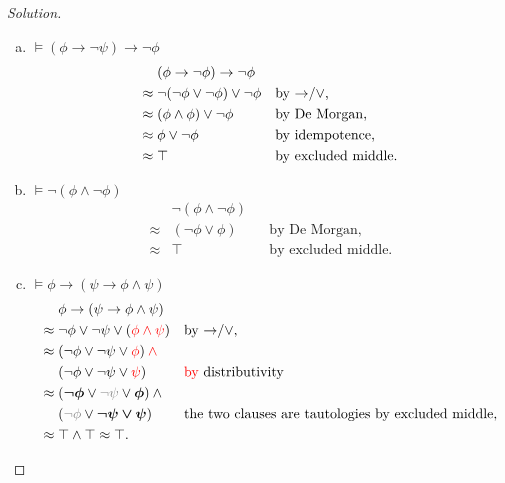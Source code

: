\documentclass[letter]{article}
\theoremstyle{definition}
\newenvironment{solution}
{\begin{proof}[Solution]}
	{\end{proof}}
\begin{document}
\begin{solution}
\begin{enumerate}[(a)]
  \item $\models (\phi \to \neg \psi) \to \neg \phi$
\begin{align*}
  & (\phi \to \neg \phi) \to \neg \phi &&
\\ \approx{}
  & \neg (\neg \phi \vee \neg \phi) \vee \neg \phi
  && \text{by {$\to$/$\lor$},}
\\ \approx{}
  & (\phi \wedge \phi) \vee \neg \phi
  && \text{by De Morgan,}
\\ \approx{}
  & \phi \lor \neg \phi
  && \text{by idempotence,}
\\ \approx{}
  & \top
  && \text{by excluded middle.}
\end{align*}

  \item $\models \neg (\phi \land \neg \phi)$
\begin{align*}
  & \neg (\phi \land \neg \phi) &&
\\ \approx{}
  & (\neg \phi \lor \phi)
  && \text{by De Morgan,}
\\ \approx{}
  & \top
  && \text{by excluded middle.}
\end{align*}

  \item $\models \phi \to (\psi \to \phi \land \psi)$
\begin{align*}
  & \phi \to (\psi \to \phi \land \psi) &&
\\ \approx{}
  & \neg \phi \lor \neg \psi \lor ({\color{red} \phi \land \psi})
  && \text{by \tolor,}
\\ \approx{}
    & (\neg \phi \lor \neg \psi \lor {\color{red}\phi}) \colop{red}{\land} {}
    &&
\\  & (\neg \phi \lor \neg \psi \lor {\color{red}\psi})
    && \text{\textcolor{red}{by} distributivity}
\\ \approx{}
    & (\bm{\neg \phi} \lor {\color{gray}\neg \psi} \lor \bm{\phi}) \land {}
    &&
\\  & ({\color{gray}\neg \phi} \lor \bm{\neg \psi \lor \psi})
    && \text{the two clauses are tautologies by excluded middle,}
\\ \approx{}
    & \top \wedge \top \approx \top.
    &&
\end{align*}


\end{enumerate}
\end{solution}
\end{document}
